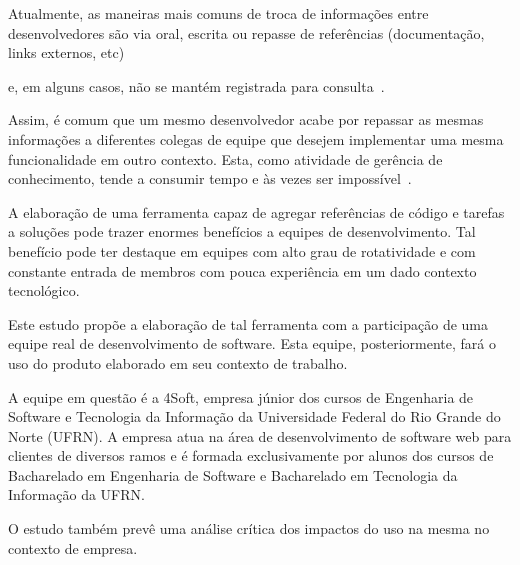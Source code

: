 

Atualmente, as maneiras mais comuns de troca de informações entre desenvolvedores são via oral, escrita ou repasse de referências (documentação, links externos, etc)~\cite{Storey2014} e, em alguns casos, não se mantém registrada para consulta~\cite{Storey2014}.



Assim, é comum que um mesmo desenvolvedor acabe por repassar as mesmas informações a diferentes colegas de equipe que desejem implementar uma mesma funcionalidade em outro contexto. Esta, como atividade de gerência de conhecimento, tende a consumir tempo e às vezes ser impossível~\cite{Levy2009}.




A elaboração de uma ferramenta capaz de agregar referências de código e tarefas a soluções pode trazer enormes benefícios a equipes de desenvolvimento. Tal benefício pode ter destaque em equipes com alto grau de rotatividade e com constante entrada de membros com pouca experiência em um dado contexto tecnológico.




Este estudo propõe a elaboração de tal ferramenta com a participação de uma equipe real de desenvolvimento de software. Esta equipe, posteriormente, fará o uso do produto elaborado em seu contexto de trabalho.

A equipe em questão é a 4Soft, empresa júnior dos cursos de Engenharia de Software e Tecnologia da Informação da Universidade Federal do Rio Grande do Norte (UFRN). A empresa atua na área de desenvolvimento de software web para clientes de diversos ramos e é formada exclusivamente por alunos dos cursos de Bacharelado em Engenharia de Software e Bacharelado em Tecnologia da Informação da UFRN.

O estudo também prevê uma análise crítica dos impactos do uso na mesma no contexto de empresa.





